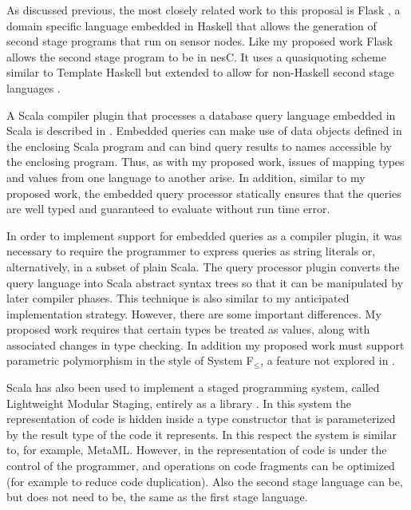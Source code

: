 \documentclass{article}
\begin{document}

As discussed previous, the most closely related work to this proposal is Flask
\cite{Mainland-Flask-2008}, a domain specific language embedded in Haskell that allows the
generation of second stage programs that run on sensor nodes. Like my proposed work Flask allows
the second stage program to be in nesC. It uses a quasiquoting scheme similar to Template
Haskell \cite{Sheard-TemplateHaskell} but extended to allow for non-Haskell second stage
languages \cite{Mainland-2007}.


A Scala compiler plugin that processes a database query language embedded in Scala is described
in \cite{Garcia-Scala-Query}. Embedded queries can make use of data objects defined in the
enclosing Scala program and can bind query results to names accessible by the enclosing program.
Thus, as with my proposed work, issues of mapping types and values from one language to another
arise. In addition, similar to my proposed work, the embedded query processor statically ensures
that the queries are well typed and guaranteed to evaluate without run time error.

In order to implement support for embedded queries as a compiler plugin, it was necessary to
require the programmer to express queries as string literals or, alternatively, in a subset of
plain Scala. The query processor plugin converts the query language into Scala abstract syntax
trees so that it can be manipulated by later compiler phases. This technique is also similar to
my anticipated implementation strategy. However, there are some important differences. My
proposed work requires that certain types be treated as values, along with associated changes in
type checking. In addition my proposed work must support parametric polymorphism in the style of
System F$_\le$, a feature not explored in \cite{Garcia-Scala-Query}.


Scala has also been used to implement a staged programming system, called Lightweight Modular
Staging, entirely as a library \cite{Rompf-LMS}. In this system the representation of code is
hidden inside a type constructor that is parameterized by the result type of the code it
represents. In this respect the system is similar to, for example, MetaML. However, in
\cite{Rompf-LMS} the representation of code is under the control of the programmer, and
operations on code fragments can be optimized (for example to reduce code duplication). Also the
second stage language can be, but does not need to be, the same as the first stage language.
\end{document}
